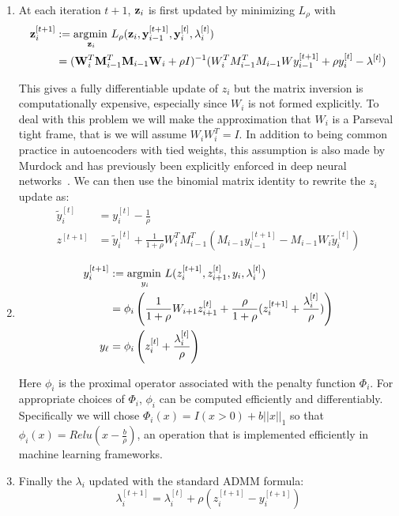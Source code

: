 \begin{enumerate}
\item
 At each iteration $t+1$, $\mathbf{z}_i$ is first updated by minimizing $L_\rho$ with 
  \begin{equation}
    \begin{aligned}
      \mathbf{z}^{[t+1]}_i &:= \operatorname*{\arg\!\min\,}_{\mathbf{z}_i} L_\rho(\mathbf{z}_i, \mathbf{y}^{[t+1]}_{i-1}, \mathbf{y}^{[t]}_i, \mathbf{\lambda}_i^{[t]})\\
      &= (\mathbf{W}_i^T\mathbf{M}_{i-1}^T\mathbf{M}_{i-1}\mathbf{W}_i + \rho I)^{-1}(W_{i}^TM_{i-1}^TM_{i-1}Wy^{[t+1]}_{i-1} + \rho y^{[t]}_{i} - \lambda^{[t]})
    \end{aligned}
    \label{eq:wupdate1}  
  \end{equation}

  This gives a fully differentiable update of $z_i$ but the matrix inversion is computationally expensive, especially since $W_i$ is not formed explicitly. To deal with this problem we will make the approximation that $W_i$ is a Parseval tight frame, that is we will assume $W_iW_i^T = I$. In addition to being common practice in autoencoders with tied weights, this assumption is also made by Murdock \etal and has previously been explicitly enforced in deep neural networks~\cite{}. We can then use the binomial matrix identity to rewrite the $z_i$ update as:
  \begin{equation}
    \begin{aligned}
      \tilde{y}_i^{[t]} &= y_i^{[t]} - \frac{1}{\rho}\\
      z^{[t+1]} &= \tilde{y}_i^{[t]} + \frac{1}{1 + \rho}W^T_iM_{i-1}^T(M_{i-1}y^{[t+1]}_{i-1} - M_{i-1}W_i\tilde{y}^{[t]}_i)
    \end{aligned}\label{eq:zupdate}
  \end{equation}
\item
  \begin{equation}
    \begin{aligned}
      y_i^{[t+1]} &:= \operatorname*{\arg\!\min\,}_{y_i} L(z^{[t+1]}_i, z^{[t]}_{i+1}, y_i, \lambda_i^{[t]})\\
      &= \phi_i\left(\frac{1}{1+\rho}W_{i+1}z^{[t]}_{i+1} + \frac{\rho}{1+\rho}(z^{[t+1]}_i + \frac{\lambda_i^{[t]}}{\rho})\right)\\
      y_{\ell} &= \phi_i\left(z_i^{[t]} + \frac{\lambda_i^{[t]}}{\rho}\right)
    \end{aligned}\label{eq:yupdate}
  \end{equation}

  Here $\phi_i$ is the proximal operator associated with the penalty function $\Phi_i$. For appropriate choices of $\Phi_i$, $\phi_i$ can be computed efficiently and differentiably. Specifically we will chose $\Phi_i(x) = I(x > 0) + b\left||x\right||_1$ so that $\phi_i(x) = Relu(x - \frac{b}{\rho})$, an operation that is implemented efficiently in machine learning frameworks.
\item Finally the $\lambda_i$ updated with the standard ADMM formula:
  \begin{equation}
    \label{eq:lupdate}
    \lambda_i^{[t+1]} = \lambda_i^{[t]} + \rho(z_i^{[t+1]} - y_i^{[t+1]})
  \end{equation}
\end{enumerate}
